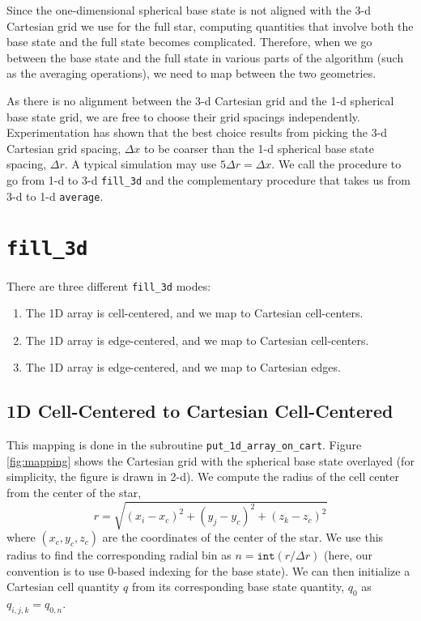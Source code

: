 Since the one-dimensional spherical base state is not aligned with the
3-d Cartesian grid we use for the full star, computing quantities that
involve both the base state and the full state becomes complicated.
Therefore, when we go between the base state and the full state in
various parts of the algorithm (such as the averaging operations), we
need to map between the two geometries.

As there is no alignment between the 3-d Cartesian grid and the 1-d
spherical base state grid, we are free to choose their grid spacings
independently.  Experimentation has shown that the best choice results
from picking the 3-d Cartesian grid spacing, $\Delta x$ to be coarser
than the 1-d spherical base state spacing, $\Delta r$.
A typical simulation may use $5 \Delta r = \Delta x$.
We call the procedure to go from 1-d to 3-d {\tt fill\_3d} and the
complementary procedure that takes us from 3-d to 1-d {\tt average}.
\section{\tt fill\_3d}
There are three different {\tt fill\_3d} modes:
\begin{enumerate}
\item The 1D array is cell-centered, and we map to Cartesian cell-centers.
\item The 1D array is edge-centered, and we map to Cartesian cell-centers.
\item The 1D array is edge-centered, and we map to Cartesian edges.  
\end{enumerate}
\subsection{1D Cell-Centered to Cartesian Cell-Centered}
This mapping is done in the subroutine {\tt put\_1d\_array\_on\_cart}.
Figure \ref{fig:mapping} shows the Cartesian grid with the spherical
base state overlayed (for simplicity, the figure is drawn in 2-d).  
We compute the radius of the cell center from the center of the star,
\begin{equation}
r = \sqrt{(x_i - x_c)^2 + (y_j - y_c)^2 + (z_k - z_c)^2}
\end{equation}
where $(x_c, y_c, z_c)$ are the coordinates of the center of the star.
We use this radius to find the corresponding radial bin as $n = \mathtt{int}(r
/ \Delta r)$ (here, our convention is to use 0-based indexing for the
base state).  We can then initialize a Cartesian cell quantity $q$ from its
corresponding base state quantity, $q_0$ as $q_{i,j,k} = q_{0,n}$.
